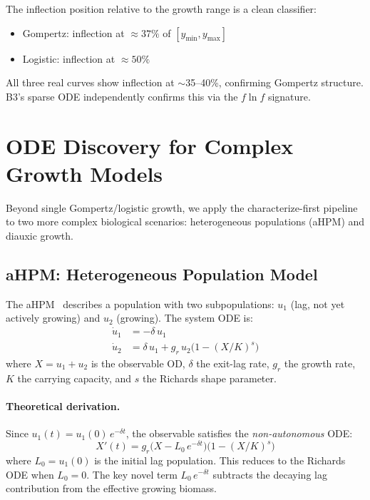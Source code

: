 \documentclass[11pt,a4paper]{article}
\begin{document}
The inflection position relative to the growth range is a clean classifier:
\begin{itemize}
  \item Gompertz: inflection at $\approx 37\%$ of $[y_{\min}, y_{\max}]$
  \item Logistic: inflection at $\approx 50\%$
\end{itemize}
All three real curves show inflection at $\sim$35–40\%, confirming Gompertz structure.
B3's sparse ODE independently confirms this via the $f\ln f$ signature.

\section{ODE Discovery for Complex Growth Models}
\label{sec:complex}

Beyond single Gompertz/logistic growth, we apply the characterize-first pipeline to
two more complex biological scenarios: heterogeneous populations (aHPM) and diauxic growth.

\subsection{aHPM: Heterogeneous Population Model}

The aHPM~\cite{baranyi1994} describes a population with two subpopulations: $u_1$ (lag,
not yet actively growing) and $u_2$ (growing). The system ODE is:
\begin{align}
  \dot{u}_1 &= -\delta\, u_1 \\
  \dot{u}_2 &= \delta\, u_1 + g_r\, u_2 \bigl(1 - (X/K)^s\bigr)
\end{align}
where $X = u_1 + u_2$ is the observable OD, $\delta$ the exit-lag rate, $g_r$ the growth
rate, $K$ the carrying capacity, and $s$ the Richards shape parameter.

\paragraph{Theoretical derivation.}
Since $u_1(t) = u_1(0)\,e^{-\delta t}$, the observable satisfies the
\emph{non-autonomous} ODE:
\begin{equation}
  \boxed{X'(t) = g_r \bigl(X - L_0\,e^{-\delta t}\bigr)\bigl(1 - (X/K)^s\bigr)}
  \label{eq:ahpm_compact}
\end{equation}
where $L_0 = u_1(0)$ is the initial lag population. This reduces to the Richards ODE
when $L_0 = 0$. The key novel term $L_0\,e^{-\delta t}$ subtracts the decaying lag
contribution from the effective growing biomass.
\end{document}
